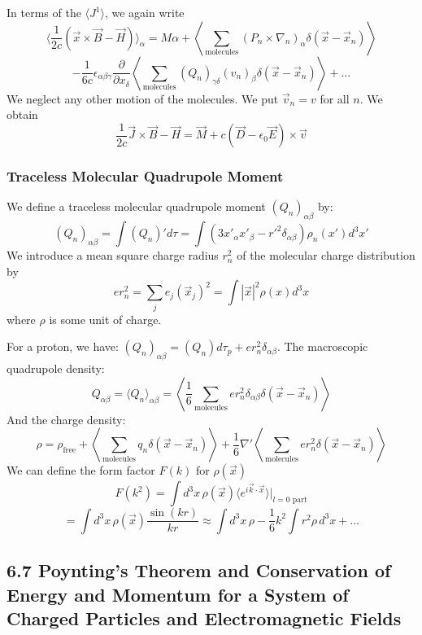 \documentclass{article}
\begin{document}
	In terms of the $\langle J^1 \rangle$, we again write
	\[ \langle \frac{1}{2c} (\vec{x} \times \vec{B} - \vec{H}) \rangle_\alpha = M\alpha + \left\langle \sum_{\text{molecules}} (P_n \times \nabla_n)_\alpha \delta(\vec{x} - \vec{x}_n) \right\rangle \]
	\[ - \frac{1}{6c} \epsilon_{\alpha\beta\gamma} \frac{\partial}{\partial x_\delta} \left\langle \sum_{\text{molecules}} (Q_n)_{\gamma\delta} (v_n)_\beta \delta(\vec{x} - \vec{x}_n) \right\rangle + \dots \]
	We neglect any other motion of the molecules. We put $\vec{v}_n = v$ for all $n$. We obtain
	\[ \frac{1}{2c} \vec{J} \times \vec{B} - \vec{H} = \vec{M} + c(\vec{D} - \epsilon_0 \vec{E}) \times \vec{v} \]
	
	\subsubsection*{Traceless Molecular Quadrupole Moment}
	We define a traceless molecular quadrupole moment $(Q_n)_{\alpha\beta}$ by:
	\[ (Q_n)_{\alpha\beta} = \int (Q_n)' d\tau = \int (3x'_\alpha x'_\beta - r'^2 \delta_{\alpha\beta}) \rho_n(x') d^3x' \]
	We introduce a mean square charge radius $r_n^2$ of the molecular charge distribution by
	\[ e r_n^2 = \sum_j e_j (\vec{x}_j)^2 = \int |\vec{x}|^2 \rho(x) d^3x \]
	where $\rho$ is some unit of charge.
	
	For a proton, we have: $(Q_n)_{\alpha\beta} = (Q_n) d\tau_p + e r_n^2 \delta_{\alpha\beta}$.
	The macroscopic quadrupole density:
	\[ Q_{\alpha\beta} = \langle Q_n \rangle_{\alpha\beta} = \left\langle \frac{1}{6} \sum_{\text{molecules}} e r_n^2 \delta_{\alpha\beta} \delta(\vec{x} - \vec{x}_n) \right\rangle \]
	And the charge density:
	\[ \rho = \rho_{\text{free}} + \left\langle \sum_{\text{molecules}} q_n \delta(\vec{x}-\vec{x}_n) \right\rangle + \frac{1}{6} \nabla' \left\langle \sum_{\text{molecules}} e r_n^2 \delta(\vec{x}-\vec{x}_n) \right\rangle \]
	We can define the form factor $F(k)$ for $\rho(\vec{x})$
	\[ F(k^2) = \int d^3x \, \rho(\vec{x}) \langle e^{i\vec{k}\cdot\vec{x}} \rangle \bigg|_{l=0 \text{ part}} \]
	\[ = \int d^3x \, \rho(\vec{x}) \frac{\sin(kr)}{kr} \approx \int d^3x \, \rho - \frac{1}{6} k^2 \int r^2 \rho \, d^3x + \dots \]
	
	\subsection*{6.7 Poynting's Theorem and Conservation of Energy and Momentum for a System of Charged Particles and Electromagnetic Fields}
	
\end{document}
